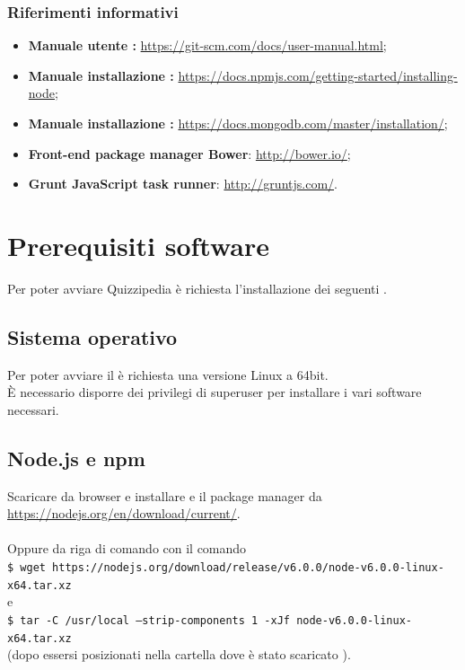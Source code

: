 \documentclass[a4paper, titlepage]{article}
\begin{document}
	\subsubsection{Riferimenti informativi}
	\begin{itemize}
		\item \textbf{Manuale utente :} \url{https://git-scm.com/docs/user-manual.html};
		\item \textbf{Manuale installazione :} \url{https://docs.npmjs.com/getting-started/installing-node};
		\item \textbf{Manuale installazione :} \url{https://docs.mongodb.com/master/installation/};
		\item \textbf{Front-end package manager Bower}: \url{http://bower.io/};
		\item \textbf{Grunt JavaScript task runner}: \url{http://gruntjs.com/}.
	\end{itemize}
	\newpage
	
	\section{Prerequisiti software}
	Per poter avviare Quizzipedia è richiesta l'installazione dei seguenti .
	
	\subsection{Sistema operativo}
	Per poter avviare il  è richiesta una versione Linux  a 64bit. \\È necessario disporre dei privilegi di superuser per installare i vari software necessari.
	
	
	\subsection{Node.js e npm}
	Scaricare da browser e installare  e il package manager  da\\ \url{https://nodejs.org/en/download/current/}.\\
	\\Oppure da riga di comando con il comando\\ \texttt{\$ wget https://nodejs.org/download/release/v6.0.0/node-v6.0.0-linux-x64.tar.xz} \\e \\ \texttt{\$ tar -C /usr/local --strip-components 1 -xJf node-v6.0.0-linux-x64.tar.xz} \\(dopo essersi posizionati nella cartella dove è stato scaricato ).
	
\end{document}
